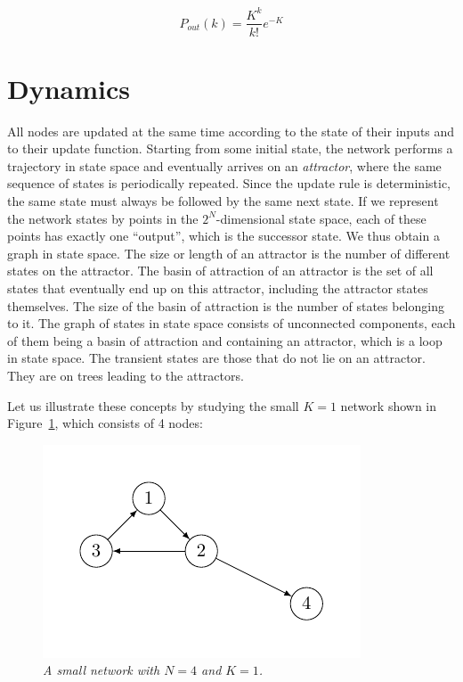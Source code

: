 $$
P_{out}(k) = \frac{K^k}{k!}e^{-K}
$$

\section{Dynamics}

All nodes are updated at the same time
according to the state of their inputs and to their update
function. Starting from some initial state, the network
performs a trajectory in state space and eventually arrives on an \emph{attractor}, where the same sequence of states
is periodically repeated. Since the update rule is deterministic, the same state must always be followed by the
same next state. If we represent the network states by
points in the $2^N$-dimensional state space, each of these
points has exactly one “output”, which is the successor
state. We thus obtain a graph in state space.
The size or length of an attractor is the number of
different states on the attractor. The basin of attraction
of an attractor is the set of all states that eventually
end up on this attractor, including the attractor states
themselves. The size of the basin of attraction is the
number of states belonging to it. The graph of states
in state space consists of unconnected components, each
of them being a basin of attraction and containing an
attractor, which is a loop in state space. The transient
states are those that do not lie on an attractor. They are
on trees leading to the attractors.


Let us illustrate these concepts by studying the small
$K = 1$ network shown in Figure~\ref{fig:rb2}, which consists of 4
nodes:

\begin{figure}[h]
\centering
\includegraphics[scale=1.4]{figurenetworks2.pdf}
\caption{\emph{A small network with $N=4$ and $K=1$.}}
\label{fig:rb2}
\end{figure}

